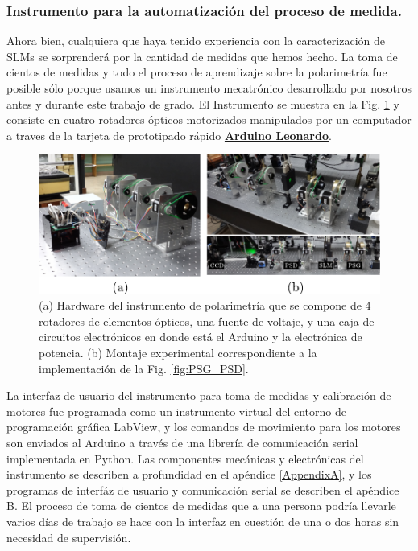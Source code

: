 \subsubsection{Instrumento para la automatización del proceso de
  medida.}
\label{sec:instrumento}
Ahora bien, cualquiera que haya tenido experiencia con la
caracterización de SLMs se sorprenderá por la cantidad de medidas que
hemos hecho. La toma de cientos de medidas y todo el proceso de
aprendizaje sobre la polarimetría fue posible sólo
porque usamos un instrumento mecatrónico desarrollado por nosotros
antes y durante este trabajo de grado. El Instrumento se muestra en la
Fig. \ref{fig:montaje_real_polarimetro} y consiste en
cuatro rotadores ópticos motorizados manipulados por un computador a
traves de la tarjeta de prototipado rápido
\href{http://www.arduino.cc/en/Main/ArduinoBoardLeonardo}{\bf{Arduino Leonardo}}. 
\begin{figure}[h!]
\centering
\includegraphics[scale=.96]{montaje_real_polarimetro.pdf}
\caption[Hardware del instrumento de polarimetría y montaje
experimental ]{(a) Hardware del instrumento de polarimetría que se
  compone de 4 rotadores de elementos ópticos, una fuente de voltaje,
  y una caja de circuitos electrónicos en donde está el Arduino y la
  electrónica de potencia. (b) Montaje experimental correspondiente a
  la implementación de la Fig. \ref{fig:PSG_PSD}. }
\label{fig:montaje_real_polarimetro}
\end{figure}
 La interfaz de usuario del instrumento para toma de medidas y
calibración de motores fue programada como un
instrumento virtual del entorno de programación gráfica LabView, y los
comandos de movimiento para los motores son enviados al Arduino a
través de una librería de comunicación serial implementada en Python.
Las componentes mecánicas y electrónicas del instrumento se describen a profundidad en el
apéndice \ref{AppendixA}, y los programas de interfáz de usuario y
comunicación serial se describen el apéndice B.
El proceso de toma de cientos de medidas que a una persona podría llevarle varios
días de trabajo se hace con la interfaz en cuestión de una o dos horas
sin necesidad de supervisión.    
\pagebreak

